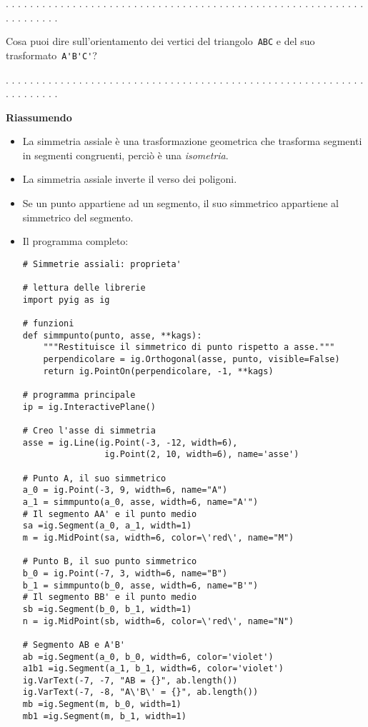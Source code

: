 . . . . . . . . . . . . . . . . . . . . . . . . . . . . . . . . . . . . . . . .
. . . . . . . . . . . . . . . . . . . . . . . . . . . .

Cosa puoi dire sull'orientamento dei vertici del triangolo~\lstinline{ABC} e 
del suo trasformato~\lstinline{A'B'C'}?

. . . . . . . . . . . . . . . . . . . . . . . . . . . . . . . . . . . . . . . .
. . . . . . . . . . . . . . . . . . . . . . . . . . . .

\textbf{Riassumendo}
\begin{itemize} [noitemsep]
\item La simmetria assiale è una trasformazione geometrica che trasforma 
segmenti
in segmenti congruenti, perciò è una \emph{isometria}.
\item La simmetria assiale inverte il verso dei poligoni.
\item Se un punto appartiene ad un segmento, il suo simmetrico appartiene al
simmetrico del segmento.
\item Il programma completo:

\begin{lstlisting}
# Simmetrie assiali: proprieta'

# lettura delle librerie
import pyig as ig

# funzioni
def simmpunto(punto, asse, **kags):
    """Restituisce il simmetrico di punto rispetto a asse."""
    perpendicolare = ig.Orthogonal(asse, punto, visible=False)
    return ig.PointOn(perpendicolare, -1, **kags)

# programma principale
ip = ig.InteractivePlane()

# Creo l'asse di simmetria
asse = ig.Line(ig.Point(-3, -12, width=6),
                ig.Point(2, 10, width=6), name='asse')

# Punto A, il suo simmetrico
a_0 = ig.Point(-3, 9, width=6, name="A")
a_1 = simmpunto(a_0, asse, width=6, name="A'")
# Il segmento AA' e il punto medio
sa =ig.Segment(a_0, a_1, width=1)
m = ig.MidPoint(sa, width=6, color=\'red\', name="M")

# Punto B, il suo punto simmetrico
b_0 = ig.Point(-7, 3, width=6, name="B")
b_1 = simmpunto(b_0, asse, width=6, name="B'")
# Il segmento BB' e il punto medio
sb =ig.Segment(b_0, b_1, width=1)
n = ig.MidPoint(sb, width=6, color=\'red\', name="N")

# Segmento AB e A'B'
ab =ig.Segment(a_0, b_0, width=6, color='violet')
a1b1 =ig.Segment(a_1, b_1, width=6, color='violet')
ig.VarText(-7, -7, "AB = {}", ab.length())
ig.VarText(-7, -8, "A\'B\' = {}", ab.length())
mb =ig.Segment(m, b_0, width=1)
mb1 =ig.Segment(m, b_1, width=1)


\end{lstlisting}
\end{itemize}

